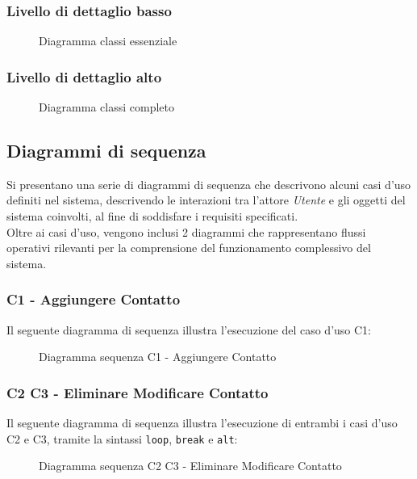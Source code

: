 \subsubsection{Livello di dettaglio basso}

\begin{figure}[h]
	\caption{Diagramma classi essenziale}
	\label{fig:Diagramma classi essenziale}
\end{figure}
\newpage
\subsubsection{Livello di dettaglio alto}

\begin{figure}[h]
	\caption{Diagramma classi completo}
	\label{fig:Diagramma classi completo}
\end{figure}

\newpage
\subsection{Diagrammi di sequenza}
Si presentano una serie di diagrammi di sequenza che descrivono alcuni casi d'uso definiti nel sistema, descrivendo le interazioni tra l'attore \textit{Utente} e gli oggetti del sistema coinvolti, al fine di soddisfare i requisiti specificati. \\
Oltre ai casi d'uso, vengono inclusi 2 diagrammi che rappresentano flussi operativi rilevanti per la comprensione del funzionamento complessivo del sistema.
\subsubsection{C1 - Aggiungere Contatto}
Il seguente diagramma di sequenza illustra l'esecuzione del caso d'uso C1:

\begin{figure}[h]
\caption{Diagramma sequenza C1 - Aggiungere Contatto}
\label{fig:Diagramma sequenza C1 - Aggiungere Contatto}
\end{figure}

\newpage
\subsubsection{C2 C3 - Eliminare Modificare Contatto}
Il seguente diagramma di sequenza illustra l'esecuzione di entrambi i casi d'uso C2 e C3, tramite la sintassi \texttt{loop}, \texttt{break} e \texttt{alt}:

\begin{figure}[h]
\caption{Diagramma sequenza C2 C3 - Eliminare Modificare Contatto}
\label{fig:Diagramma sequenza C2 C3 - Eliminare Modificare Contatto}
\end{figure}


